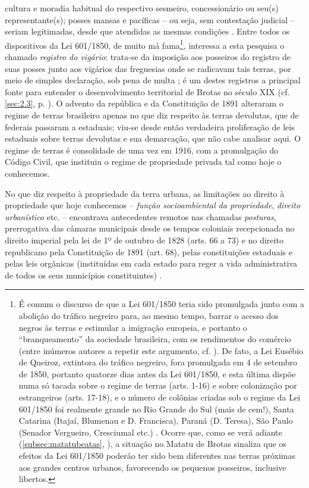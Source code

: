 cultura e moradia habitual do respectivo sesmeiro, concessionário ou seu(s) representante(s); posses mansas e pacíficas -- ou seja, sem contestação judicial -- seriam legitimadas, desde que atendidas as mesmas condições \cite[p.~54-55]{sodero_diragrario_1990}. Entre todos os dispositivos da Lei 601/1850, de muito má fama\footnote{É comum o discurso de que a Lei 601/1850 teria sido promulgada junto com a abolição do tráfico negreiro para, ao mesmo tempo, barrar o acesso dos negros às terras e estimular a imigração europeia, e portanto o ``branqueamento'' da sociedade brasileira, com os rendimentos do comércio (entre inúmeros autores a repetir este argumento, cf. ). De fato, a Lei Eusébio de Queiroz, extintora do tráfico negreiro, fora promulgada em 4 de setembro de 1850, portanto quatorze dias antes da Lei 601/1850, e esta última dispõe numa só tacada sobre o regime de terras (arts. 1-16) e sobre colonização por estrangeiros (arts. 17-18), e o número de colônias criadas sob o regime da Lei 601/1850 foi realmente grande no Rio Grande do Sul (mais de cem!), Santa Catarina (Itajaí, Blumenau e D. Francisca), Paraná (D. Teresa), São Paulo (Senador Vergueiro, Cresciumal etc.) \cite[p.~58]{sodero_diragrario_1990}. Ocorre que, como se verá adiante (\autoref{subsec:matatubeatas}, \pageref{subsec:matatubeatas}), a situação no Matatu de Brotas sinaliza que os efeitos da Lei 601/1850 poderão ter sido bem diferentes nas terras próximas aos grandes centros urbanos, favorecendo os pequenos posseiros, inclusive libertos.}, interessa a esta pesquisa o chamado \textit{registro do vigário}: trata-se da imposição aos posseiros do registro de suas posses junto aos vigários das freguesias onde se radicavam tais terras, por meio de simples declaração, sob pena de multa \cite[pp.~55-56]{sodero_diragrario_1990}; é um destes registros a principal fonte para entender o desenvolvimento territorial de Brotas no século XIX (cf. \autoref{sec:2.3}, p. \pageref{sec:2.3}). O advento da república e da Constituição de 1891 alteraram o regime de terras brasileiro apenas no que diz respeito às terras devolutas, que de federais passaram a estaduais; viu-se desde então verdadeira proliferação de leis estaduais sobre terras devolutas e sua demarcação, que não cabe analisar aqui. O regime de terras é consolidade de uma vez em 1916, com a promulgação do Código Civil, que instituiu o regime de propriedade privada tal como hoje o conhecemos. 

No que diz respeito à propriedade da terra urbana, as limitações ao direito à propriedade que hoje conhecemos -- \textit{função socioambiental da propriedade}, \textit{direito urbanístico} etc. -- encontrava antecedentes remotos nas chamadas \textit{posturas}, prerrogativa das câmaras municipais desde os tempos coloniais recepcionada no direito imperial pela lei de 1º de outubro de 1828 (arts. 66 a 73) e no direito republicano pela Constituição de 1891 (art. 68), pelas constituições estaduais e pelas leis orgânicas (instituídas em cada estado para reger a vida administrativa de todos os seus municípios constituintes) \cite{campanhole_const_1992}.